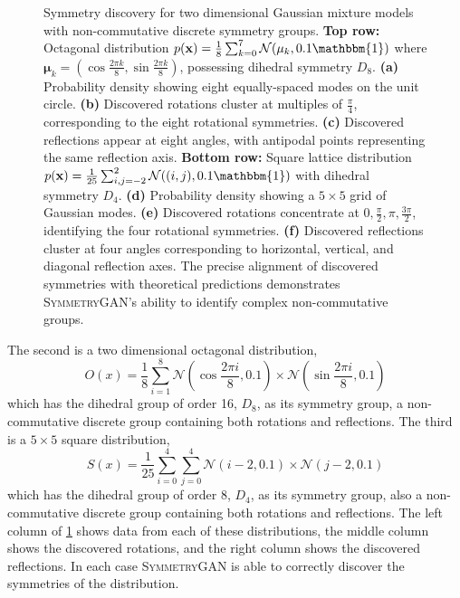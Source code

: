 \begin{figure}
    \caption[Discovery of dihedral symmetries $D_8$ and $D_4$ in octagonal and square lattice Gaussian mixtures.]{Symmetry discovery for two dimensional Gaussian mixture models with non-commutative discrete symmetry groups. \textbf{Top row:} Octagonal distribution $p(\mathbf{x}) = \frac{1}{8}\sum_{k=0}^{7} \mathcal{N}(\mathbf{\mu}_k, 0.1\mathbbm{1})$ where $\mathbf{\mu}_k = (\cos\frac{2\pi k}{8}, \sin\frac{2\pi k}{8})$, possessing dihedral symmetry $D_8$. \textbf{(a)} Probability density showing eight equally-spaced modes on the unit circle. \textbf{(b)} Discovered rotations cluster at multiples of $\frac{\pi}{4}$, corresponding to the eight rotational symmetries. \textbf{(c)} Discovered reflections appear at eight angles, with antipodal points representing the same reflection axis. \textbf{Bottom row:} Square lattice distribution $p(\mathbf{x}) = \frac{1}{25}\sum_{i,j=-2}^{2} \mathcal{N}((i,j), 0.1\mathbbm{1})$ with dihedral symmetry $D_4$. \textbf{(d)} Probability density showing a $5 \times 5$ grid of Gaussian modes. \textbf{(e)} Discovered rotations concentrate at $0, \frac{\pi}{2}, \pi, \frac{3\pi}{2}$, identifying the four rotational symmetries. \textbf{(f)} Discovered reflections cluster at four angles corresponding to horizontal, vertical, and diagonal reflection axes. The precise alignment of discovered symmetries with theoretical predictions demonstrates \textsc{SymmetryGAN}'s ability to identify complex non-commutative groups.}
    \label{fig:otherdistributions-2D}
\end{figure}
                The second is a two dimensional octagonal distribution,
                \[
                    O(x) = \frac{1}{8}\sum_{i=1}^{8} \mathcal{N}(\cos\frac{2\pi i}{8}, 0.1)\times \mathcal{N}(\sin\frac{2\pi i}{8}, 0.1)
                \]
                which has the dihedral group of order 16, \(D_8\), as its symmetry group, a non-commutative discrete group containing both rotations and reflections.
                The third is a \(5\times 5\) square distribution,
                \[
                    S(x) = \frac{1}{25}\sum_{i=0}^{4}\sum_{j=0}^{4} \mathcal{N}(i-2, 0.1)\times \mathcal{N}(j-2, 0.1)
                \]
                which has the dihedral group of order 8, \(D_4\), as its symmetry group, also a non-commutative discrete group containing both rotations and reflections.
                The left column of \cref{fig:otherdistributions-2D} shows data from each of these distributions, the middle column shows the discovered rotations, and the right column shows the discovered reflections.
                In each case \textsc{SymmetryGAN} is able to correctly discover the symmetries of the distribution.

